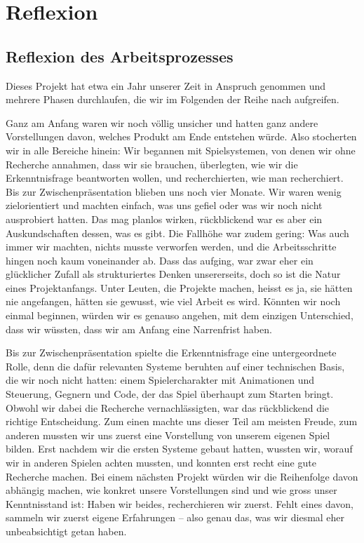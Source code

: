 \documentclass[../Main.tex]{subfiles}
\begin{document}
\section{Reflexion} \label{sec:Reflexion}

\subsection{Reflexion des Arbeitsprozesses}

Dieses Projekt hat etwa ein Jahr unserer Zeit in Anspruch genommen und mehrere Phasen durchlaufen, die wir im Folgenden der Reihe nach aufgreifen.

Ganz am Anfang waren wir noch völlig unsicher und hatten ganz andere Vorstellungen davon, welches Produkt am Ende entstehen würde. Also stocherten wir in alle Bereiche hinein: Wir begannen mit Spielsystemen, von denen wir ohne Recherche annahmen, dass wir sie brauchen, überlegten, wie wir die Erkenntnisfrage beantworten wollen, und recherchierten, wie man recherchiert. Bis zur Zwischenpräsentation blieben uns noch vier Monate. Wir waren wenig zielorientiert und machten einfach, was uns gefiel oder was wir noch nicht ausprobiert hatten. Das mag planlos wirken, rückblickend war es aber ein Auskundschaften dessen, was es gibt. Die Fallhöhe war zudem gering: Was auch immer wir machten, nichts musste verworfen werden, und die Arbeitsschritte hingen noch kaum voneinander ab. Dass das aufging, war zwar eher ein glücklicher Zufall als strukturiertes Denken unsererseits, doch so ist die Natur eines Projektanfangs. Unter Leuten, die Projekte machen, heisst es ja, sie hätten nie angefangen, hätten sie gewusst, wie viel Arbeit es wird. Könnten wir noch einmal beginnen, würden wir es genauso angehen, mit dem einzigen Unterschied, dass wir wüssten, dass wir am Anfang eine Narrenfrist haben.

Bis zur Zwischenpräsentation spielte die Erkenntnisfrage eine untergeordnete Rolle, denn die dafür relevanten Systeme beruhten auf einer technischen Basis, die wir noch nicht hatten: einem Spielercharakter mit Animationen und Steuerung, Gegnern und Code, der das Spiel überhaupt zum Starten bringt. Obwohl wir dabei die Recherche vernachlässigten, war das rückblickend die richtige Entscheidung. Zum einen machte uns dieser Teil am meisten Freude, zum anderen mussten wir uns zuerst eine Vorstellung von unserem eigenen Spiel bilden. Erst nachdem wir die ersten Systeme gebaut hatten, wussten wir, worauf wir in anderen Spielen achten mussten, und konnten erst recht eine gute Recherche machen. Bei einem nächsten Projekt würden wir die Reihenfolge davon abhängig machen, wie konkret unsere Vorstellungen sind und wie gross unser Kenntnisstand ist: Haben wir beides, recherchieren wir zuerst. Fehlt eines davon, sammeln wir zuerst eigene Erfahrungen -- also genau das, was wir diesmal eher unbeabsichtigt getan haben.
\end{document}

